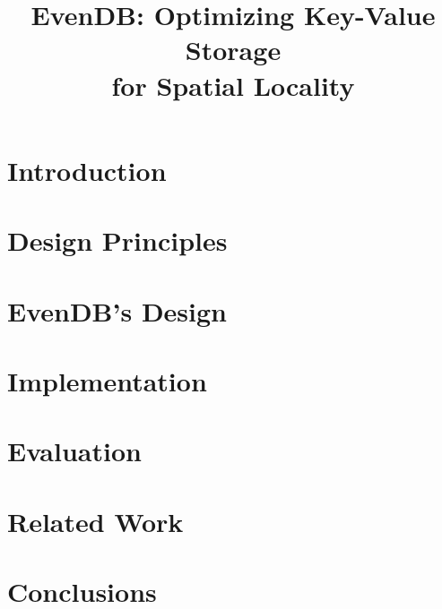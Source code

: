 \documentclass[sigplan,10pt]{acmart}
\date{}
\newcommand{\sys}{EvenDB}
\begin{document}
\title[\sys: Key-Value Storage for Spatial Locality]{\sys: Optimizing Key-Value Storage\\ for Spatial Locality} 
\author{}

\begin{abstract}

\end{abstract}

\maketitle

\section{Introduction}
\label{sec:intro}


\section{Design Principles}
\label{sec:principles}

\section{\sys's Design}
\label{sec:design}


\section{Implementation}
\label{sec:impl}


\section{Evaluation}
\label{sec:eval}


\section{Related Work}
\label{sec:related}


\section{Conclusions}
\label{sec:conclusions}




\clearpage


\end{document}
